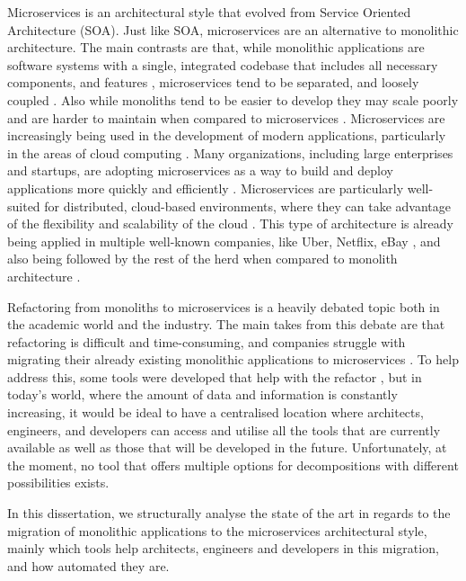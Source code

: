 Microservices is an architectural style that evolved from Service Oriented
Architecture (SOA). Just like SOA, microservices are an alternative to
monolithic architecture. The main contrasts are that, while monolithic
applications are software systems with a single, integrated codebase that
includes all necessary components, and features
\cite{kazanavivcius2019migrating}, microservices tend to be separated, and
loosely coupled \cite{newman2021building}. Also while monoliths tend to be
easier to develop they may scale poorly and are harder to maintain when
compared to microservices \cite{newman2019monolith}. Microservices are
increasingly being used in the development of modern applications, particularly
in the areas of cloud computing \cite{balalaie2016migrating}. Many
organizations, including large enterprises and startups, are adopting
microservices as a way to build and deploy applications more quickly and
efficiently . Microservices are particularly
well-suited for distributed, cloud-based environments, where they can take
advantage of the flexibility and scalability of the cloud
. This type of architecture is
already being applied in multiple well-known companies, like Uber, Netflix,
eBay \cite{ren2018migrating}, and also being
followed by the rest of the herd when compared to monolith architecture
\cite{taibi2017processes}.

Refactoring from monoliths to microservices is a heavily debated topic both in
the academic world and the industry. The main takes from this debate are that
refactoring is difficult and time-consuming, and companies struggle with
migrating their already existing monolithic applications to microservices
\cite{kamimura2018extracting}. To help address this, some tools were developed
that help with the refactor , but in today's world, where the
amount of data and information is constantly increasing, it would be ideal to
have a centralised location where architects, engineers, and developers can
access and utilise all the tools that are currently available as well as those
that will be developed in the future. Unfortunately, at the moment, no tool
that offers multiple options for decompositions with different possibilities
exists.

In this dissertation, we structurally analyse the state of the art in regards
to the migration of monolithic applications to the microservices architectural
style, mainly which tools help architects, engineers and developers in this
migration, and how automated they are.

